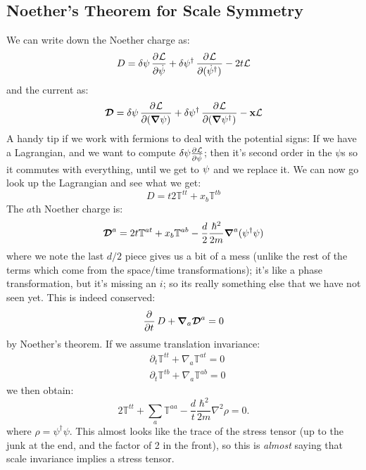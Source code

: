 \subsection{Noether's Theorem for Scale Symmetry}
We can write down the Noether charge as:
\begin{equation}
    D = \delta \psi \dpd{\L}{\dot{\psi}} + \delta \psi^\dag \dpd{\L}{(\dot{\psi}^\dag)} - 2t\L
\end{equation}
and the current as:
\begin{equation}
    \gv{\mathcal{D}} = \delta \psi \dpd{\L}{(\nabla \psi)} + \delta \psi^\dag \dpd{\L}{(\nabla \psi^\dag)} - \v{x}\L
\end{equation}
A handy tip if we work with fermions to deal with the potential signs: If we have a Lagrangian, and we want to compute $\delta \psi \pd{\L}{\dot{\psi}}$; then it's second order in the $\psi$s so it commutes with everything, until we get to $\do{\psi}$ and we replace it. We can now go look up the Lagrangian and see what we get:
\begin{equation}
    D = t2\mathbb{T}^{tt} + x_b\mathbb{T}^{tb} 
\end{equation}
The $a$th Noether charge is:
\begin{equation}
    \gv{\mathcal{D}}^a = 2t\mathbb{T}^{at} + x_b\mathbb{T}^{ab} - \frac{d}{2}\frac{\hbar^2}{2m}\nabla^a(\psi^\dag\psi)
\end{equation}
where we note the last $d/2$ piece gives us a bit of a mess (unlike the rest of the terms which come from the space/time transformations); it's like a phase transformation, but it's missing an $i$; so its really something else that we have not seen yet. This is indeed conserved:
\begin{equation}
    \dpd{}{t}D + \nabla_a \gv{\mathcal{D}}^a = 0
\end{equation}
by Noether's theorem. If we assume translation invariance:
\begin{equation}\label{eq-transinvariance}
    \begin{split}
        &\partial_t \mathbb{T}^{tt} + \nabla_a\mathbb{T}^{at} = 0
        \\ &\partial_t \mathbb{T}^{tb} + \nabla_a\mathbb{T}^{ab} = 0
    \end{split}
\end{equation}
we then obtain:
\begin{equation}
    2\mathbb{T}^{tt} + \sum_a \mathbb{T}^{aa} - \frac{d}{t}\frac{\hbar^2}{2m}\nabla^2\rho = 0.
\end{equation}
where $\rho = \psi^\dag\psi$. This almost looks like the trace of the stress tensor (up to the junk at the end, and the factor of 2 in the front), so this is \emph{almost} saying that scale invariance implies a stress tensor. 

